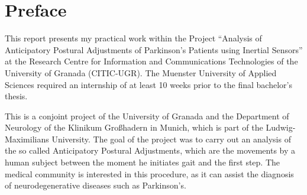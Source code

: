 \chapter*{Preface}

This report presents my practical work within the Project ``Analysis of Anticipatory Postural Adjustments of Parkinson's Patients using Inertial Sensors'' at the Research Centre for Information and Communications Technologies of the University of Granada (CITIC-UGR). The Muenster University of Applied Sciences required an internship of at least 10 weeks prior to the final bachelor's thesis.

This is a conjoint project of the University of Granada and the Department of Neurology of the Klinikum Großhadern in Munich, which is part of the Ludwig-Maximilians University. The goal of the project was to carry out an analysis of the so called Anticipatory Postural Adjustments, which are the movements by a human subject between the moment he initiates gait and the first step. The medical community is interested in this procedure, as it can assist the diagnosis of neurodegenerative diseases such as Parkinson's.